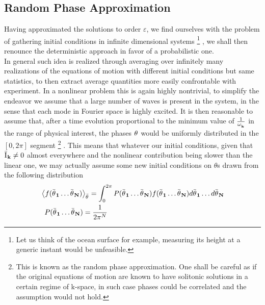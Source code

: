 \subsection{Random Phase Approximation}

Having approximated the solutions to order $\varepsilon$, we find ourselves with the problem of gathering 
initial conditions in infinite dimensional systems
\footnote{Let us think of the ocean surface for example, measuring its height at a generic instant would be unfeasible.}
, we shall then renounce the deterministic approach in favor of 
a probabilistic one.\\
In general such idea is realized through averaging over infinitely many realizations of the equations of motion with different initial conditions but same statistics, to then extract 
average quantities more easily confrontable with experiment. In a nonlinear problem this is again highly nontrivial, to simplify the endeavor we assume that
a large number of waves is present in the system, in the sense that each mode in Fourier space is highly excited. It is then reasonable to assume that, after a time
evolution proportional to the minimum value of $\frac{1}{\omega^{}_{\mathbf{k}}}$ in the range of physical interest, the phases $\theta^{}$ would be uniformly distributed in the $\left[0,2\pi\right]$ segment 
\footnote{This is known as the random phase approximation. One shall be careful as if the original equations of motion are known to have solitonic solutions in a certain regime of k-space, 
in such case phases could be correlated and the assumption would not hold.}
. This means that whatever our initial conditions, given that $\bar{\mathrm{I}^{}}_\mathbf{k} \neq 0$ almost everywhere and the nonlinear contribution being slower than the linear one,
we may actually assume some new initial conditions on $\theta$s drawn from the following distribution
\begin{equation}
    \begin{aligned}
    &\left\langle f(\bar{\theta^{}}_\mathbf{1} \dots \bar{\theta^{}}_\mathbf{N}) \right\rangle_{\bar{\theta}^{}} = 
    \int_{0}^{2\pi} P(\bar{\theta^{}}_\mathbf{1} \dots \bar{\theta^{}}_\mathbf{N})f(\bar{\theta^{}}_\mathbf{1} \dots 
    \bar{\theta^{}}_\mathbf{N}) d\bar{\theta^{}}_\mathbf{1} \dots d\bar{\theta^{}}_\mathbf{N} 
     \\
    & \hspace{2mm} P(\bar{\theta^{}}_\mathbf{1} \dots \bar{\theta^{}}_\mathbf{N}) = \frac{1}{2\pi^{N}}
    \end{aligned}
\end{equation}

